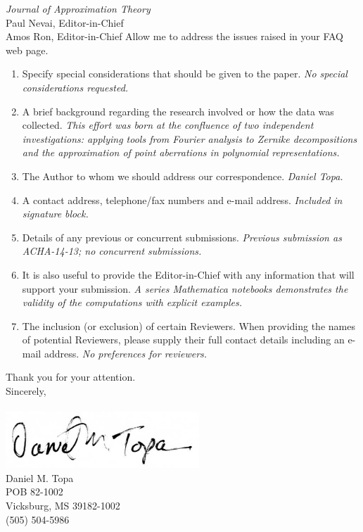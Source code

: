 \documentclass[]{letter} %
\begin{document}
\begin{letter}{\emph{Journal of Approximation Theory} \\
Paul Nevai, Editor-in-Chief\\Amos Ron, Editor-in-Chief}
\noindent Allow me to address the issues raised in your FAQ web page.

\begin{enumerate}
\item Specify special considerations that should be given to the paper. \emph{No special considerations requested.} \\

\item A brief background regarding the research involved or how the data was collected. \emph{This effort was born at the confluence of two independent investigations: applying tools from Fourier analysis to Zernike decompositions and the approximation of point aberrations in polynomial representations.} \\

\item The Author to whom we should address our correspondence. \emph{Daniel Topa.} \\

\item A contact address, telephone/fax numbers and e-mail address.  \emph{Included in signature block.} \\

\item Details of any previous or concurrent submissions.  \emph{Previous submission as ACHA-14-13; no concurrent submissions.} \\

\item It is also useful to provide the Editor-in-Chief with any information that will support your submission.  \emph{A series \emph{Mathematica} notebooks demonstrates the validity of the computations with explicit examples.} \\

\item The inclusion (or exclusion) of certain Reviewers. When providing the names of potential Reviewers, please supply their full contact details including an e-mail address.  \emph{No preferences for reviewers.} \\
\end{enumerate}


\noindent Thank you for your attention.
\\

Sincerely, \\
\\
\includegraphics[]{signature001}\\
Daniel M. Topa \\
POB 82-1002 \\
Vicksburg, MS 39182-1002 \\
(505) 504-5986 
\end{letter}
  
%
\end{document}
